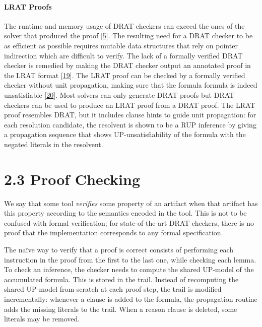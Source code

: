 \documentclass[
]{report}
\begin{document}
\paragraph{LRAT Proofs}

The runtime and memory usage of DRAT checkers can exceed the ones of the
solver that produced the proof
{[}\protect\hyperlink{ref-DBLP:confux2faaaiux2fHeule18}{5}{]}. The
resulting need for a DRAT checker to be as efficient as possible
requires mutable data structures that rely on pointer indirection which
are difficult to verify. The lack of a formally verified DRAT checker is
remedied by making the DRAT checker output an annotated proof in the
LRAT format
{[}\protect\hyperlink{ref-DBLP:confux2fcadeux2fCruz-FilipeHHKS17}{19}{]}.
The LRAT proof can be checked by a formally verified checker without
unit propagation, making sure that the formula formula is indeed
unsatisfiable
{[}\protect\hyperlink{ref-DBLP:confux2fitpux2fHeuleHKW17}{20}{]}. Most
solvers can only generate DRAT proofs but DRAT checkers can be used to
produce an LRAT proof from a DRAT proof. The LRAT proof resembles DRAT,
but it includes clause hints to guide unit propagation: for each
resolution candidate, the resolvent is shown to be a RUP inference by
giving a propagation sequence that shows UP-unsatisfiability of the
formula with the negated literals in the resolvent.

\hypertarget{proof-checking}{%
\section{2.3 Proof Checking}\label{proof-checking}}

We say that some tool \emph{verifies} some property of an artifact when
that artifact has this property according to the semantics encoded in
the tool. This is not to be confused with formal verification; for
state-of-the-art DRAT checkers, there is no proof that the
implementation corresponds to any formal specification.

The naïve way to verify that a proof is correct consists of performing
each instruction in the proof from the first to the last one, while
checking each lemma. To check an inference, the checker needs to compute
the shared UP-model of the accumulated formula. This is stored in the
trail. Instead of recomputing the shared UP-model from scratch at each
proof step, the trail is modified incrementally: whenever a clause is
added to the formula, the propagation routine adds the missing literals
to the trail. When a reason clause is deleted, some literals may be
removed.
\end{document}
